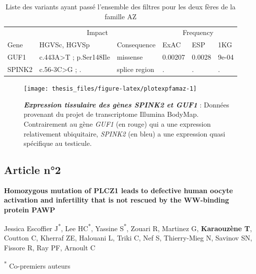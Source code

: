 \documentclass[12pt,a4paper,twoside]{ugathesis}
\theoremstyle{definition}
\theoremstyle{definition}
\theoremstyle{definition}
\theoremstyle{remark}
\begin{document}
\begin{longtable}[t]{llllll}
\caption{\label{tab:tabrecapaz}Liste des variants ayant passé l'ensemble des filtres pour les deux fères de la famille AZ}\\
\toprule
\multicolumn{1}{c}{ } & \multicolumn{2}{c}{Impact} & \multicolumn{3}{c}{Frequency} \\
\cmidrule(l{2pt}r{2pt}){2-3} \cmidrule(l{2pt}r{2pt}){4-6}
Gene & HGVSc, HGVSp & Consequence & ExAC & ESP & 1KG\\
\midrule
GUF1 & c.443A>T ; p.Ser148Ile & missense & 0.00207 & 0.0028 & 9e-04\\
SPINK2 & c.56-3C>G ; . & splice region & . & . & .\\
\bottomrule
\end{longtable}

\begin{figure}

{\centering \texttt{[image: thesis\_files/figure-latex/plotexpfamaz-1]} 

}

\caption[Expression tissulaire des gènes \emph{SPINK2} et
\emph{GUF1}]{\textbf{\emph{Expression tissulaire des gènes
\emph{SPINK2} et \emph{GUF1}}} : Données provenant du projet de
transcriptome Illumina BodyMap. Contrairement au gène \emph{GUF1} (en
rouge) qui a une expression relativement ubiquitaire, \emph{SPINK2} (en
bleu) a une expression quasi spécifique au testicule.}\label{fig:plotexpfamaz}
\end{figure}










\newpage

\subsection{Article n°2}\label{article-n2}

\textbf{Homozygous mutation of PLCZ1 leads to defective human oocyte
activation and infertility that is not rescued by the WW-binding protein
PAWP}

Jessica Escoffier J\textsuperscript{*}, Lee HC\textsuperscript{*},
Yassine S\textsuperscript{*}, Zouari R, Martinez G, \textbf{Karaouzène
T}, Coutton C, Kherraf ZE, Halouani L, Triki C, Nef S, Thierry-Mieg N,
Savinov SN, Fissore R, Ray PF, Arnoult C

\textsuperscript{*} Co-premiers auteurs
\end{document}
